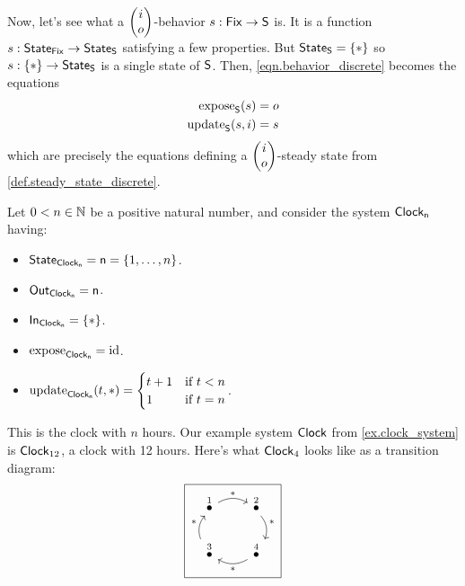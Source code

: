 \documentclass[DynamicalBook]{subfiles}
\begin{document}
{\begin{example}
  Now, let's see what a $\begin{pmatrix}{i} \\ {o} \end{pmatrix}$-behavior $s : \mathsf{Fix} \to \mathsf{S}$ is. It is
  a function $s : \mathsf{State}_{\mathsf{Fix}} \to \mathsf{State}_{\mathsf{S}}$ satisfying a few properties. But
  $\mathsf{State}_{\mathsf{S}} = \{\ast\}$ so $s : \{\ast\} \to \mathsf{State}_{\mathsf{S}}$ is a single state of
  $\mathsf{S}$. Then, \cref{eqn.behavior_discrete} becomes the equations
  \begin{align*}
    \mathrm{expose}_{\mathsf{S}}(s) &= o\\
    \mathrm{update}_{\mathsf{S}}(s, i) &= s
  \end{align*}
  which are precisely the equations defining a $\begin{pmatrix}{i} \\ {o} \end{pmatrix}$-steady state from \cref{def.steady_state_discrete}.
  
\end{example}

\begin{example}\label{ex.periodic_orbit_as_behavior}
  Let $0 < n \in \mathbb{N}$ be a positive natural number, and consider the system $\mathsf{Clock_n}$
  having:
  \begin{itemize}
    \item $\mathsf{State}_{\mathsf{Clock_n}} = \mathsf{n} = \{1,\ldots, n\}$.
    \item $\mathsf{Out}_{\mathsf{Clock_n}} = \mathsf{n}$.
    \item $\mathsf{In}_{\mathsf{Clock_n}} = \{\ast\}$.
    \item $\mathrm{expose}_{\mathsf{Clock_n}} = \mathrm{id}$.
    \item $\mathrm{update}_{\mathsf{Clock_n}}(t, \ast) = \begin{cases} t + 1 &\mbox{if $t < n$}
        \\ 1 &\mbox{if $t = n$}  \end{cases}$.
  \end{itemize}

This is the clock with $n$ hours. Our example system $\mathsf{Clock}$ from
\cref{ex.clock_system} is $\mathsf{Clock}_{12}$, a clock with 12 hours. Here's what
$\mathsf{Clock}_4$ looks like as a transition diagram:
\[
\begin{tikzpicture}
	\node[draw] {
  \begin{tikzcd}[sep=small]
    \LMO{1} \ar[rr, bend left, "\ast"] & & \LMO{2} \ar[dd, bend left, "\ast"] \\
    & & \\
\LMO{3} \ar[rr, leftarrow, bend right, "\ast"'] \ar[uu, bend left, "\ast"] & & \LMO{4}
  \end{tikzcd}
  };
\end{tikzpicture}
\]


\end{example}}
\end{document}
